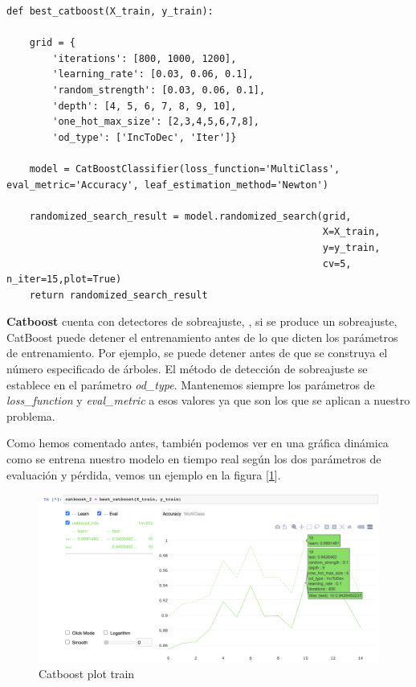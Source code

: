 \documentclass[12pt,twoside]{report}
\begin{document}
\begin{lstlisting}
def best_catboost(X_train, y_train):
    
    grid = {
        'iterations': [800, 1000, 1200], 
        'learning_rate': [0.03, 0.06, 0.1],
        'random_strength': [0.03, 0.06, 0.1],
        'depth': [4, 5, 6, 7, 8, 9, 10],
        'one_hot_max_size': [2,3,4,5,6,7,8],
        'od_type': ['IncToDec', 'Iter']}
    
    model = CatBoostClassifier(loss_function='MultiClass', eval_metric='Accuracy', leaf_estimation_method='Newton')
    
    randomized_search_result = model.randomized_search(grid,
                                                       X=X_train,
                                                       y=y_train,
                                                       cv=5, n_iter=15,plot=True)    
    return randomized_search_result
\end{lstlisting}

\textbf{Catboost} cuenta con detectores de sobreajuste, \cite{catboost-overfit}, si se produce un sobreajuste, CatBoost puede detener el entrenamiento antes de lo que dicten los parámetros de entrenamiento. Por ejemplo, se puede detener antes de que se construya el número especificado de árboles. El método de detección de sobreajuste se establece en el parámetro \textit{od\_type}. Mantenemos siempre los parámetros de \textit{loss\_function} y \textit{eval\_metric} a esos valores ya que son los que se aplican a nuestro problema.

Como hemos comentado antes, también podemos ver en una gráfica dinámica como se entrena nuestro modelo en tiempo real según los dos parámetros de evaluación y pérdida, vemos un ejemplo en la figura [\ref{fig:catboost_train}].

\begin{figure}[H]
\includegraphics[width=\textwidth]{../notebooks/figures/catboost_train.png}
\caption{Catboost plot train}
\label{fig:catboost_train}
\end{figure} 
\end{document}
